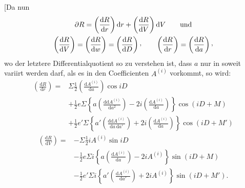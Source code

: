 [Da nun
\[
\begin{gathered}
\partial R=\left(\frac{\mathrm{d}R}{\mathrm{d}r}\right)\mathrm{d}r+\left(\frac{\mathrm{d}R}{\mathrm{d}V}\right)\mathrm{d}V\qquad\text{und}\\
\left(\frac{\mathrm{d}R}{\mathrm{d}V}\right)=\left(\frac{\mathrm{d}R}{\mathrm{d}w}\right)=\left(\frac{\mathrm{d}R}{\mathrm{d}D}\right)\text{\raisebox{.45ex}{,}}\qquad
\left(\frac{\mathrm{d}R}{\mathrm{d}r}\right)=\left(\frac{\mathrm{d}R}{\mathrm{d}a}\right)\text{\raisebox{.45ex}{,}}
\end{gathered}
\]
\noindent wo der letztere Differentialquotient so zu verstehen ist, dass \(a\) nur in soweit variirt werden darf, als es in den Coefficienten \(A^{(i)}\) vorkommt, so wird:
\[
\begin{aligned}
\left(\frac{\mathrm{d}R}{\mathrm{d}r}\right)={}&\Sigma\tfrac12\left(\frac{\mathrm{d}A^{(i)}}{\mathrm{d}a}\right)\cos iD\\
&+\tfrac12 e\Sigma\left\{a\left(\frac{\mathrm{d}\mathrm{d}A^{(i)}}{\mathrm{d}a^2}\right)-2i\left(\frac{\mathrm{d}A^{(i)}}{\mathrm{d}a}\right)\right\}\cos(iD+M)\\
&+\tfrac12 e'\Sigma\left\{a'\left(\frac{\mathrm{d}\mathrm{d}A^{(i)}}{\mathrm{d}a\,\mathrm{d}a'}\right)+2i\left(\frac{\mathrm{d}A^{(i)}}{\mathrm{d}a}\right)\right\}\cos(iD+M')
\end{aligned}
\]
\[
\begin{aligned}
\left(\frac{\mathrm{d}R}{\mathrm{d}V}\right)={}&-\Sigma\tfrac12 iA^{(i)}\sin iD\\
&-\tfrac12 e\Sigma i\left\{a\left(\frac{\mathrm{d}A^{(i)}}{\mathrm{d}a}\right)-2iA^{(i)}\right\}\sin(iD+M)\\
&-\tfrac12 e'\Sigma i\left\{a'\left(\frac{\mathrm{d}A^{(i)}}{\mathrm{d}a'}\right)+2iA^{(i)}\right\}\sin(iD+M').
\end{aligned}
\]

